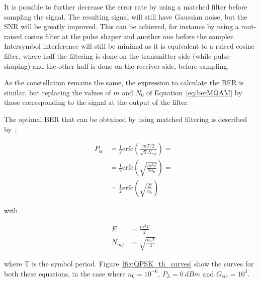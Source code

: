 

It is possible to further decrease the error rate by using a matched filter before sampling the signal. The resulting signal will still have Gaussian noise, but the SNR will be greatly improved. This can be achieved, for instance by using a root-raised cosine filter at the pulse shaper and another one before the sampler. Intersymbol interference will still be minimal as it is equivalent to a raised cosine filter, where half the filtering is done on the transmitter side (while pulse-shaping) and the other half is done on the receiver side, before sampling.

As the constellation remains the same, the expression to calculate the BER is similar, but replacing the values of $m$ and $N_0$ of Equation~\eqref{eq:berMQAM} by those corresponding to the signal at the output of the filter.

The optimal BER that can be obtained by using matched filtering is described by~\cite{mischasch}:

\begin{eqnarray}\label{eq:berBPSK}
&P_{be} &= \frac{1}{2} \text{erfc}\left({\frac{mT/2}{\sqrt{2} N_{mf}}}\right) =\\
&	    &= \frac{1}{2} \text{erfc}\left(\sqrt{{\frac{m^2T}{2 n_0}}}\right) =\\
&	    &= \frac{1}{2} \text{erfc}\left(\sqrt{{\frac{E}{n_0}}}\right)
\end{eqnarray}

with

\begin{eqnarray}
&E &= \frac{m^2 T}{2} \\
&N_{mf} &= \sqrt{\frac{n_0 T}{4}}
\end{eqnarray}

where T is the symbol period.
Figure~\ref{fig:QPSK_th_curves} show the curves for both these equations, in the case where  $n_0=10^{-6}$, $P_L = 0~dBm$ and $G_{ele} = 10^3$.


